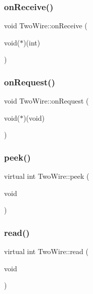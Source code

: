 \subsubsection{\texorpdfstring{on\+Receive()}{onReceive()}}
{\footnotesize\ttfamily void Two\+Wire\+::on\+Receive (\begin{DoxyParamCaption}\item[{void($\ast$)(int)}]{ }\end{DoxyParamCaption})}

\mbox{\label{class_two_wire_a224bf8799dda398fc0db223801852ca5}} 
\subsubsection{\texorpdfstring{on\+Request()}{onRequest()}}
{\footnotesize\ttfamily void Two\+Wire\+::on\+Request (\begin{DoxyParamCaption}\item[{void($\ast$)(void)}]{ }\end{DoxyParamCaption})}

\mbox{\label{class_two_wire_ac347efa8f804b718763fdbaae53c406d}} 
\subsubsection{\texorpdfstring{peek()}{peek()}}
{\footnotesize\ttfamily virtual int Two\+Wire\+::peek (\begin{DoxyParamCaption}\item[{void}]{ }\end{DoxyParamCaption})\hspace{0.3cm}{\ttfamily [virtual]}}

\mbox{\label{class_two_wire_a7769632871ef9bbe8c0850a8ff8a0b5f}} 
\subsubsection{\texorpdfstring{read()}{read()}}
{\footnotesize\ttfamily virtual int Two\+Wire\+::read (\begin{DoxyParamCaption}\item[{void}]{ }\end{DoxyParamCaption})\hspace{0.3cm}{\ttfamily [virtual]}}


